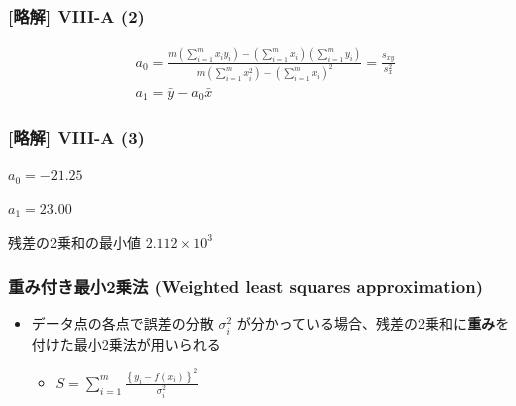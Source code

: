 \documentclass[dvipdfmx,aspectratio=169,20pt]{beamer}
\newcommand{\myfontsetting}[3]{{\fontsize{#1}{#2}\selectfont #3}}
\begin{document}
\begin{frame}
\frametitle{[略解] V\hspace{-.1em}I\hspace{-.1em}I\hspace{-.1em}I-A (2)}
\myfontsetting{15pt}{15pt}{ 
\begin{align*}
    & a_0 = \frac{m \left(\sum_{i=1}^m x_i y_i\right) - \left(\sum_{i=1}^m x_i \right) \left(\sum_{i=1}^m y_i \right)}{m \left(\sum_{i=1}^m x_i^2 \right) -  \left(\sum_{i=1}^m x_i \right)^2} =\frac{s_{xy}}{s_x^2}\\
    &a_1 = \bar{y} - a_0 \bar{x}
\end{align*}
}
\end{frame}
\begin{frame}
\frametitle{[略解] V\hspace{-.1em}I\hspace{-.1em}I\hspace{-.1em}I-A (3)}
$a_0 = -21.25$

$a_1 = 23.00$

残差の2乗和の最小値 $2.112\times 10^3$
\end{frame}
\begin{frame}
\frametitle{\myfontsetting{20pt}{20pt}{ [補足] 重み付き最小2乗法 \myfontsetting{10pt}{10pt}{ (Weighted least squares approximation)}}}

\begin{itemize}
    \setlength{\itemsep}{0.05cm}
    \item \myfontsetting{18pt}{18pt}{
    データ点の各点で誤差の分散 $\sigma_i^2$ が分かっている場合、残差の2乗和に{\bf 重み}を付けた最小2乗法が用いられる
    }
    \vspace{2mm}
    \begin{itemize}
        \item \myfontsetting{15pt}{15pt}{$\displaystyle
    S=\sum_{i=1}^m \frac{\left\{ y_i -f(x_i) \right\}^2}{\sigma_i^2}$}
    \end{itemize}
\end{itemize}
\end{frame}
\end{document}
